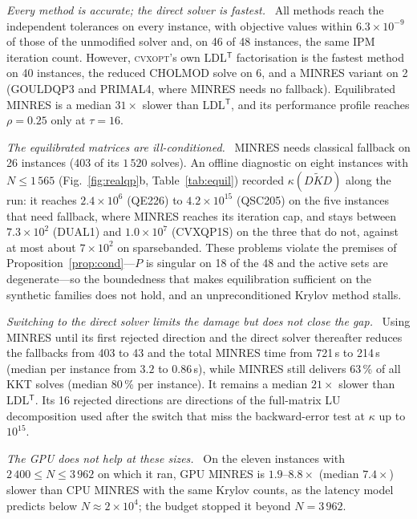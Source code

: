 \documentclass[11pt]{article}
\theoremstyle{definition}
\newcommand{\Kt}{\tilde K}
\newcommand{\T}{^{\mathsf T}}
\newcommand{\dsus}{\textunderscore\penalty5000\hskip0pt\relax}
\newcommand{\ds}[1]{{\ttfamily\let\_\dsus#1}}
\newcommand{\lead}[1]{\emph{#1}\ }
\begin{document}
\lead{Every method is accurate; the direct solver is fastest.} All methods reach the independent tolerances on every instance, with objective values within $6.3\times10^{-9}$ of those of the unmodified solver and, on 46 of 48 instances, the same IPM iteration count. However, \textsc{cvxopt}'s own LDL$\T$ factorisation is the fastest method on 40 instances, the reduced CHOLMOD solve on 6, and a MINRES variant on 2 (\ds{GOULDQP3} and \ds{PRIMAL4}, where MINRES needs no fallback). Equilibrated MINRES is a median $31\times$ slower than LDL$\T$, and its performance profile reaches $\rho=0.25$ only at $\tau=16$.

\lead{The equilibrated matrices are ill-conditioned.} MINRES needs classical fallback on 26 instances (403 of its $1\,520$ solves). An offline diagnostic on eight instances with $N\le1\,565$ (Fig.~\ref{fig:realqp}b, Table~\ref{tab:equil}) recorded $\kappa(D\Kt D)$ along the run: it reaches $2.4\times10^{6}$ (\ds{QE226}) to $4.2\times10^{15}$ (\ds{QSC205}) on the five instances that need fallback, where MINRES reaches its iteration cap, and stays between $7.3\times10^{2}$ (\ds{DUAL1}) and $1.0\times10^{7}$ (\ds{CVXQP1\_S}) on the three that do not, against at most about $7\times10^{2}$ on \ds{sparse\_banded}. These problems violate the premises of Proposition~\ref{prop:cond}---$P$ is singular on 18 of the 48 and the active sets are degenerate---so the boundedness that makes equilibration sufficient on the synthetic families does not hold, and an unpreconditioned Krylov method stalls.

\lead{Switching to the direct solver limits the damage but does not close the gap.} Using MINRES until its first rejected direction and the direct solver thereafter reduces the fallbacks from 403 to 43 and the total MINRES time from 721\,s to 214\,s (median per instance from $3.2$ to $0.86$\,s), while MINRES still delivers 63\,\% of all KKT solves (median 80\,\% per instance). It remains a median $21\times$ slower than LDL$\T$. Its 16 rejected directions are directions of the full-matrix LU decomposition used after the switch that miss the backward-error test at $\kappa$ up to $10^{15}$.

\lead{The GPU does not help at these sizes.} On the eleven instances with $2\,400\le N\le3\,962$ on which it ran, GPU MINRES is $1.9$--$8.8\times$ (median $7.4\times$) slower than CPU MINRES with the same Krylov counts, as the latency model predicts below $N\approx2\times10^{4}$; the budget stopped it beyond $N=3\,962$.
\end{document}
